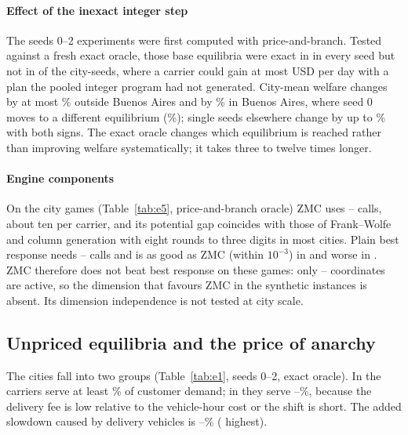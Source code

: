 \documentclass[preprint,12pt]{elsarticle}
\theoremstyle{definition}
\theoremstyle{remark}
\begin{document}
\paragraph{Effect of the inexact integer step} The seeds 0--2 experiments were first computed with price-and-branch. Tested against a fresh exact oracle, those base equilibria were exact in \ExOldExactCities{} in every seed but not in \ExOldBadN{} of the \ExOldN{} city-seeds, where a carrier could gain at most \ExOldBadMax{} USD per day with a plan the pooled integer program had not generated. City-mean welfare changes by at most \ExEoneWMeanMaxNotBA\% outside Buenos Aires and by \ExEoneWMeanBA\% in Buenos Aires, where seed 0 moves to a different equilibrium (\ExEoneWChangeBA\%); single seeds elsewhere change by up to \ExEoneWChangeMaxNotBA\% with both signs. The exact oracle changes which equilibrium is reached rather than improving welfare systematically; it takes three to twelve times longer.

\paragraph{Engine components} On the city games (Table~\ref{tab:e5}, price-and-branch oracle) ZMC uses \EfiveCallsZMCmin--\EfiveCallsZMCmax{} calls, about ten per carrier, and its potential gap coincides with those of Frank--Wolfe and column generation with eight rounds to three digits in most cities. Plain best response needs \EfiveCallsBRmin--\EfiveCallsBRmax{} calls and is as good as ZMC (within $10^{-3}$) in \EfiveBRasgoodCities{} and worse in \EfiveBRworseCities. ZMC therefore does not beat best response on these games: only \EfiveDeffMin--\EfiveDeffMax{} coordinates are active, so the dimension that favours ZMC in the synthetic instances is absent. Its dimension independence is not tested at city scale.

\subsection{Unpriced equilibria and the price of anarchy}\label{sec:res-eq}\label{sec:res-poa}

The cities fall into two groups (Table~\ref{tab:e1}, seeds 0--2, exact oracle). In \EoneHighCities{} the carriers serve at least \EoneServedHighMin\% of customer demand; in \EoneLowCities{} they serve \EoneServedLowMin--\EoneServedLowMax\%, because the delivery fee is low relative to the vehicle-hour cost or the shift is short. The added slowdown caused by delivery vehicles is \EoneSlowMin--\EoneSlowMax\% (\EoneSlowMaxCity{} highest).
\end{document}
